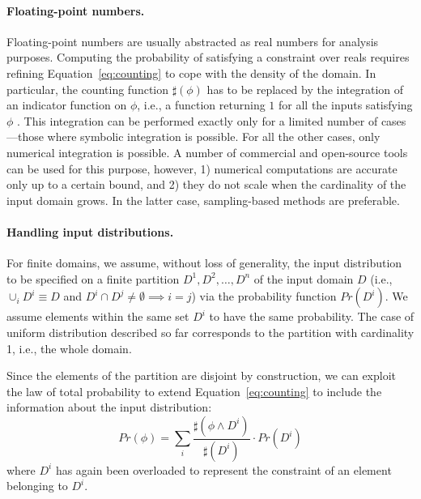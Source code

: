 \begin{itemize}

\end{itemize}


\paragraph{Floating-point numbers.} 
Floating-point numbers are usually abstracted as real numbers for analysis purposes. Computing the probability of satisfying a constraint over reals requires refining Equation~\ref{eq:counting} to cope with the density of the domain. In particular, the counting function $\sharp(\phi)$ has to be replaced by the integration of an indicator function on $\phi$, i.e., a function returning $1$ for all the inputs satisfying $\phi$ \cite{Borges2014}. This integration can be performed exactly only for a limited number of cases---those where symbolic integration is possible. For all the other cases, only numerical integration is possible. A number of commercial and open-source tools can be used for this purpose, however, 1) numerical computations are accurate only up to a certain bound, and 2) they do not scale when the cardinality of the input domain grows. In the latter case, sampling-based methods are preferable. 

\paragraph{Handling input distributions.} 
For finite domains, we assume, without loss of generality, the input distribution to be specified on a finite partition $D^1, D^2, \dots, D^n$ of the input domain $D$ (i.e., $\cup_i D^i \equiv D$ and $D^i \cap D^j \neq \emptyset \implies i=j$) via the probability function $Pr(D^i)$. We assume elements within the same set $D^i$ to have the same probability. The case of uniform distribution described so far corresponds to the partition with cardinality 1, i.e., the whole domain.
 
Since the elements of the partition are disjoint by construction, we can exploit the law of total probability to extend Equation~\eqref{eq:counting} to include the information about the input distribution:
%
\begin{equation}\label{eq:countingInputDistribution}
	Pr(\phi) = \sum_i \frac{\sharp(\phi \land D^i)}{\sharp(D^i)} \cdot Pr(D^i)
\end{equation}
%
\noindent where $D^i$ has again been overloaded to represent the constraint of an element belonging to $D^i$.

